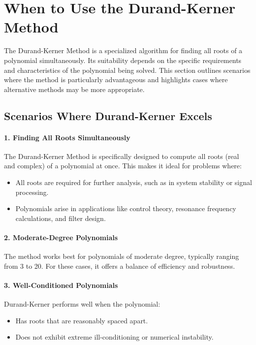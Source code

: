 \documentclass[10pt]{IEEEtran}
\begin{document}
\section{When to Use the Durand-Kerner Method}
The Durand-Kerner Method is a specialized algorithm for finding all roots of a polynomial simultaneously. Its suitability depends on the specific requirements and characteristics of the polynomial being solved. This section outlines scenarios where the method is particularly advantageous and highlights cases where alternative methods may be more appropriate.

\subsection{Scenarios Where Durand-Kerner Excels}
\paragraph{1. Finding All Roots Simultaneously}
The Durand-Kerner Method is specifically designed to compute all roots (real and complex) of a polynomial at once. This makes it ideal for problems where:
\begin{itemize}
    \item All roots are required for further analysis, such as in system stability or signal processing.
    \item Polynomials arise in applications like control theory, resonance frequency calculations, and filter design.
\end{itemize}

\paragraph{2. Moderate-Degree Polynomials}
The method works best for polynomials of moderate degree, typically ranging from 3 to 20. For these cases, it offers a balance of efficiency and robustness.

\paragraph{3. Well-Conditioned Polynomials}
Durand-Kerner performs well when the polynomial:
\begin{itemize}
    \item Has roots that are reasonably spaced apart.
    \item Does not exhibit extreme ill-conditioning or numerical instability.
\end{itemize}
\end{document}
